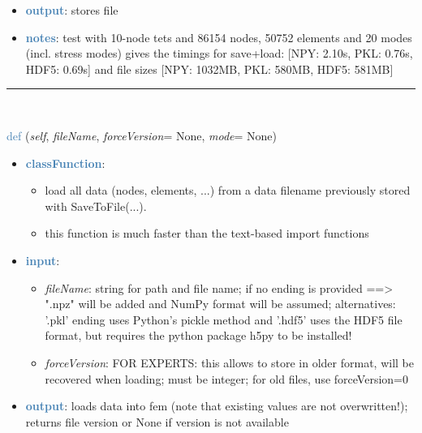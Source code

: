 \begin{itemize}[leftmargin=1.4cm]
\begin{itemize}[leftmargin=1.4cm]
\begin{itemize}[leftmargin=1.4cm]
\begin{itemize}[leftmargin=0.5cm]
\begin{itemize}[leftmargin=1.4cm]
\begin{itemize}[leftmargin=1.4cm]
\begin{itemize}[leftmargin=1.4cm]
\begin{itemize}[leftmargin=0.5cm]
\begin{itemize}[leftmargin=0.7cm]
\item[--]\textcolor{steelblue}{\bf output}: stores file
\item[--]\textcolor{steelblue}{\bf notes}: test with 10-node tets and 86154 nodes, 50752 elements and 20 modes (incl. stress modes) gives the timings for save+load: [NPY: 2.10s, PKL: 0.76s, HDF5: 0.69s] and file sizes [NPY: 1032MB, PKL: 580MB, HDF5: 581MB]
\vspace{12pt}\end{itemize}
%
\noindent\rule{8cm}{0.75pt}\vspace{1pt} \\ 
\begin{flushleft}
\noindent \textcolor{steelblue}{def {\bf {}}}\label{sec:FEM:FEMinterface:LoadFromFile}
({\it self}, {\it fileName}, {\it forceVersion}= None, {\it mode}= None)
\end{flushleft}
\setlength{\itemindent}{0.7cm}
\begin{itemize}[leftmargin=0.7cm]
\item[--]\textcolor{steelblue}{\bf classFunction}: \vspace{-6pt}
\begin{itemize}[leftmargin=1.2cm]
\setlength{\itemindent}{-0.7cm}
\item[]load all data (nodes, elements, ...) from a data filename previously stored with SaveToFile(...).
\item[]this function is much faster than the text-based import functions
\end{itemize}
\item[--]\textcolor{steelblue}{\bf input}: \vspace{-6pt}
\begin{itemize}[leftmargin=1.2cm]
\setlength{\itemindent}{-0.7cm}
\item[]{\it fileName}: string for path and file name; if no ending is provided ==> ".npz" will be added and NumPy format will be assumed; alternatives: '.pkl' ending uses Python's pickle method and '.hdf5' uses the HDF5 file format, but requires the python package h5py to be installed!
\item[]{\it forceVersion}: FOR EXPERTS: this allows to store in older format, will be recovered when loading; must be integer; for old files, use forceVersion=0
\end{itemize}
\item[--]\textcolor{steelblue}{\bf output}: loads data into fem (note that existing values are not overwritten!); returns file version or None if version is not available

\end{itemize}
\end{itemize}
\end{itemize}
\end{itemize}
\end{itemize}
\end{itemize}
\end{itemize}
\end{itemize}
\end{itemize}
